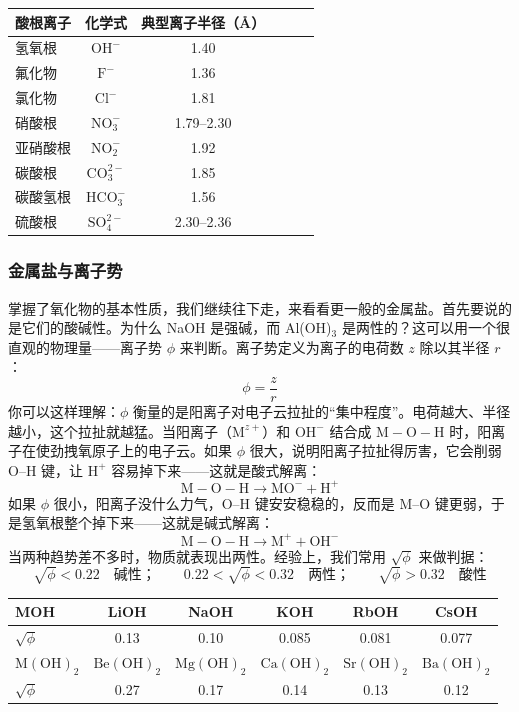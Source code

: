 \documentclass[UTF8]{ctexbook}
\begin{document}
\medskip
\begin{center}
\begin{tabular*}{\textwidth}{@{\extracolsep{\fill}}lccccc@{}}
\toprule
酸根离子 & 化学式 & 典型离子半径（\AA） \\
\midrule
氢氧根 & $\mathrm{OH^-}$ & 1.40 \\
氟化物 & $\mathrm{F^-}$ & 1.36 \\
氯化物 & $\mathrm{Cl^-}$ & 1.81 \\
硝酸根 & $\mathrm{NO_3^-}$ & 1.79--2.30 \\
亚硝酸根 & $\mathrm{NO_2^-}$ & 1.92 \\
碳酸根 & $\mathrm{CO_3^{2-}}$ & 1.85 \\
碳酸氢根 & $\mathrm{HCO_3^-}$ & 1.56 \\
硫酸根 & $\mathrm{SO_4^{2-}}$ & 2.30--2.36 \\
\bottomrule
\end{tabular*}
\renewcommand{\arraystretch}{1.0}
\end{center}

\medskip

\subsubsection{金属盐与离子势}

掌握了氧化物的基本性质，我们继续往下走，来看看更一般的金属盐。首先要说的是它们的酸碱性。为什么 NaOH 是强碱，而 Al(OH)$_3$ 是两性的？这可以用一个很直观的物理量——离子势 $\phi$ 来判断。离子势定义为离子的电荷数 $z$ 除以其半径 $r$：
\[
\phi=\frac{z}{r}
\]
你可以这样理解：$\phi$ 衡量的是阳离子对电子云拉扯的“集中程度”。电荷越大、半径越小，这个拉扯就越猛。当阳离子（$\mathrm{M}^{z+}$）和 $\mathrm{OH^-}$ 结合成 $\mathrm{M\!-\!O\!-\!H}$ 时，阳离子在使劲拽氧原子上的电子云。如果 $\phi$ 很大，说明阳离子拉扯得厉害，它会削弱 O--H 键，让 $\mathrm{H^+}$ 容易掉下来——这就是酸式解离：
\[
\mathrm{M\!-\!O\!-\!H \longrightarrow MO^{-} + H^{+}}
\]
如果 $\phi$ 很小，阳离子没什么力气，O--H 键安安稳稳的，反而是 M--O 键更弱，于是氢氧根整个掉下来——这就是碱式解离：
\[
\mathrm{M\!-\!O\!-\!H \longrightarrow M^{+} + OH^{-}}
\]
当两种趋势差不多时，物质就表现出两性。经验上，我们常用 $\sqrt{\phi}$ 来做判据：
\[
\sqrt{\phi}<0.22\quad \text{碱性；}\qquad
0.22<\sqrt{\phi}<0.32\quad \text{两性；}\qquad
\sqrt{\phi}>0.32\quad \text{酸性}
\]

\renewcommand{\arraystretch}{1.2}
\noindent\begin{tabular*}{\textwidth}{@{\extracolsep{\fill}}lccccc@{}}
\toprule
MOH & LiOH & NaOH & KOH & RbOH & CsOH \\
\midrule
$\sqrt{\phi}$ & 0.13 & 0.10 & 0.085 & 0.081 & 0.077 \\
\midrule
$\mathrm{M(OH)_2}$ & $\mathrm{Be(OH)_2}$ & $\mathrm{Mg(OH)_2}$ & $\mathrm{Ca(OH)_2}$ & $\mathrm{Sr(OH)_2}$ & $\mathrm{Ba(OH)_2}$ \\
\midrule
$\sqrt{\phi}$ & 0.27 & 0.17 & 0.14 & 0.13 & 0.12 \\
\bottomrule
\end{tabular*}
\renewcommand{\arraystretch}{1.0}
\end{document}

